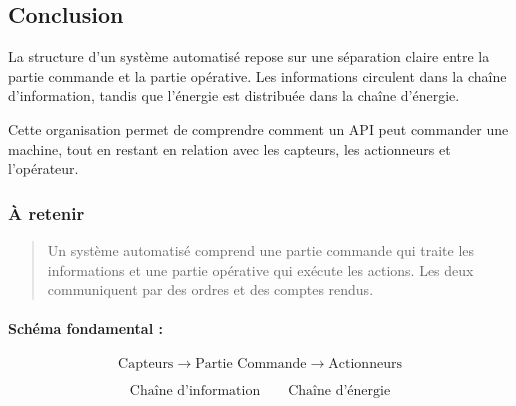 \subsection{Conclusion}

La structure d'un système automatisé repose sur une séparation claire entre la partie commande et la partie opérative. Les informations circulent dans la chaîne d'information, tandis que l'énergie est distribuée dans la chaîne d'énergie.

Cette organisation permet de comprendre comment un API peut commander une machine, tout en restant en relation avec les capteurs, les actionneurs et l'opérateur.

\subsubsection*{À retenir}

\begin{quote}
Un système automatisé comprend une partie commande qui traite les informations et une partie opérative qui exécute les actions. Les deux communiquent par des ordres et des comptes rendus.
\end{quote}

\paragraph{Schéma fondamental :}

\[
\text{Capteurs} \rightarrow \text{Partie Commande} \rightarrow \text{Actionneurs}
\]

\[
\text{Chaîne d'information} \qquad \text{Chaîne d'énergie}
\]